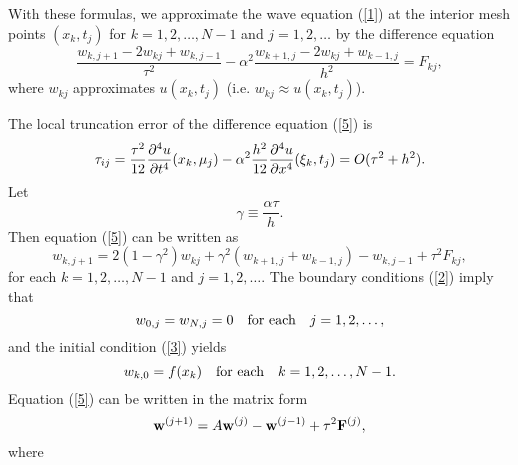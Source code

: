    
With these formulas, we approximate the
wave equation (\ref{1}) at the interior mesh points $(x_{k},
t_{j})$ for $k=1, 2, \dots, N-1$ and $j=1, 2, \dots$ by the
difference equation
\begin{equation}
\frac{w_{k,j+1}-2w_{kj}+w_{k,j-1}}{\tau^{2}}-\alpha^{2}
\frac{w_{k+1, j}-2w_{kj}+w_{k-1,j}}{h^{2}}=F_{kj}, \label{5}
\end{equation}
where $w_{kj}$ approximates $u(x_{k},t_{j})$ (i.e. $w_{kj}\approx
u(x_{k},t_{j})$).

    The local truncation error of the
difference equation (\ref{5}) is
\[
\tau_{ij}=\frac{\tau^{2}}{12}\frac{{\partial}^{4} u}{{\partial} t^{4}}(x_{k},
\mu_{j})-\alpha^2 \frac{h^{2}}{12}\frac{{\partial}^{4} u}{{\partial}
x^{4}}(\xi_{k}, t_{j})=O(\tau^{2}+h^{2}).
\]
Let
\[
\gamma\equiv\frac{\alpha\tau}{h}.
\]
Then equation (\ref{5}) can be written as
\begin{equation}
w_{k,j+1}=2\left(1-\gamma^{2}\right)w_{kj}+
\gamma^{2}\left(w_{k+1, j}+w_{k-1,j}\right)-w_{k,j-1}+\tau^2
F_{kj} , \label{6}
\end{equation}
for each $k=1, 2, \dots, N-1$ and $j=1, 2, \dots$. The boundary
conditions (\ref{2}) imply that
\begin{equation}
w_{0,j}=w_{N,j}=0 \quad \hbox{for each} \quad j=1, 2, \dots,
\label{7}
\end{equation}
and the initial condition (\ref{3}) yields
\begin{equation}
w_{k,0}=f(x_{k}) \quad \hbox{for each} \quad k=1, 2, \dots, N-1.
\label{8}
\end{equation}
Equation (\ref{5}) can be written in the matrix form
\begin{equation}
{\bf w}^{(j+1)}=A{\bf w}^{(j)}-{\bf w}^{(j-1)}+\tau^2{\bf F}^{(j)},
\label{9}
\end{equation}
where
